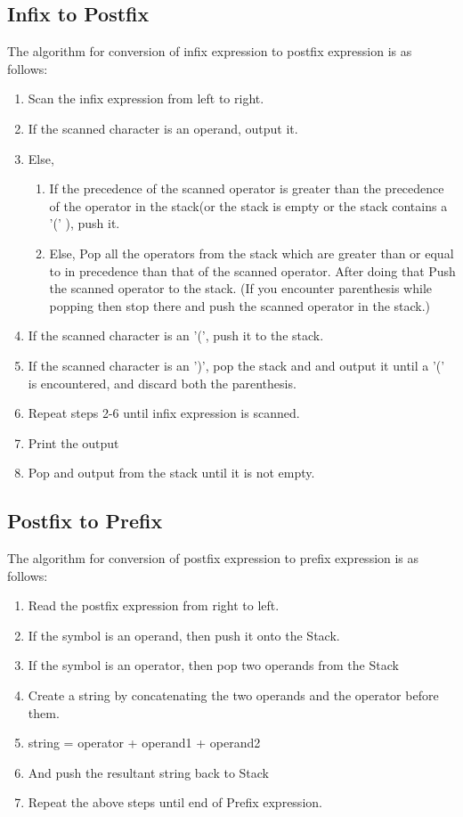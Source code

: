 \documentclass[11pt]{article}
\begin{document}
\subsection{Infix to Postfix}
The algorithm for conversion of infix expression to postfix expression is as follows:
\begin{enumerate}
	\item Scan the infix expression from left to right.
	\item If the scanned character is an operand, output it.
	\item Else,
	      \begin{enumerate}
		      \item If the precedence of the scanned operator is greater than the precedence of the
		            operator in the stack(or the stack is empty or the stack contains a '(' ), push it.
		      \item Else, Pop all the operators from the stack which are greater than or equal to in
		            precedence than that of the scanned operator. After doing that Push the scanned
		            operator to the stack. (If you encounter parenthesis while popping then stop there
		            and push the scanned operator in the stack.)
	      \end{enumerate}
	\item If the scanned character is an '(', push it to the stack.
	\item If the scanned character is an ')', pop the stack and and output it until a '(' is
	      encountered, and discard both the parenthesis.
	\item Repeat steps 2-6 until infix expression is scanned.
	\item Print the output
	\item Pop and output from the stack until it is not empty.
\end{enumerate}

\subsection{Postfix to Prefix}
The algorithm for conversion of postfix expression to prefix expression is as follows:
\begin{enumerate}
	\item Read the postfix expression from right to left.
	\item If the symbol is an operand, then push it onto the Stack.
	\item If the symbol is an operator, then pop two operands from the Stack
	\item Create a string by concatenating the two operands and the operator before them.
	\item string = operator + operand1 + operand2
	\item And push the resultant string back to Stack
	\item Repeat the above steps until end of Prefix expression.
\end{enumerate}
\end{document}
